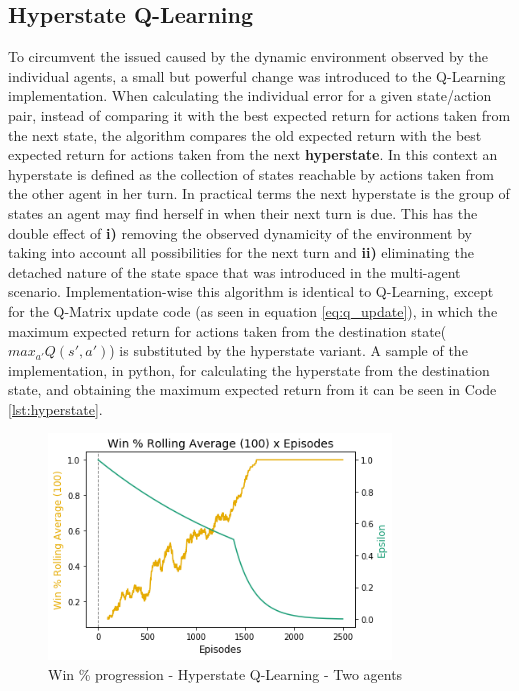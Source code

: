 \documentclass[10pt]{article}
\begin{document}
    \subsection{Hyperstate Q-Learning}
    To circumvent the issued caused by the dynamic environment observed by the individual agents, a small but powerful change was introduced to the Q-Learning implementation. When calculating the individual error for a given state/action pair, instead of comparing it with the best expected return for actions taken from the next state, the algorithm compares the old expected return with the best expected return for actions taken from the next \textbf{hyperstate}. In this context an hyperstate is defined as the collection of states reachable by actions taken from the other agent in her turn. In practical terms the next hyperstate is the group of states an agent may find herself in when their next turn is due. This has the double effect of \textbf{i)} removing the observed dynamicity of the environment by taking into account all possibilities for the next turn and \textbf{ii)} eliminating the detached nature of the state space that was introduced in the multi-agent scenario. Implementation-wise this algorithm is identical to Q-Learning, except for the Q-Matrix update code (as seen in equation \ref{eq:q_update}), in which the maximum expected return for actions taken from the destination state($max_{a'} Q(s',a')$) is substituted by the hyperstate variant. A sample of the implementation, in python, for calculating the hyperstate from the destination state, and obtaining the maximum expected return from it can be seen in Code \ref{lst:hyperstate}.

    \begin{figure}[h]
        \centering
        \includegraphics[height=6cm]{Images/exp_III/1_winning.png}
        \caption{Win \% progression - Hyperstate Q-Learning - Two agents}
        \label{fig:expIII:winning}
    \end{figure}
\end{document}
